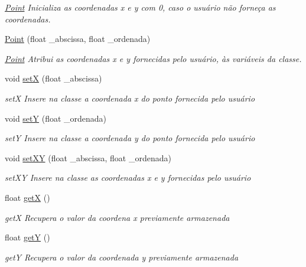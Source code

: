 \begin{DoxyCompactItemize}
\begin{DoxyCompactList}\small\item\em \hyperlink{class_point}{Point} Inicializa as coordenadas x e y com 0, caso o usuário não forneça as coordenadas. \end{DoxyCompactList}\item 
\hyperlink{class_point_a8c100b422fca2e51ddda13512a44f75a}{Point} (float \+\_\+abscissa, float \+\_\+ordenada)
\begin{DoxyCompactList}\small\item\em \hyperlink{class_point}{Point} Atribui as coordenadas x e y fornecidas pelo usuário, às variáveis da classe. \end{DoxyCompactList}\item 
void \hyperlink{class_point_a44d3365a8b5e0475e637bbf05e904f45}{setX} (float \+\_\+abscissa)
\begin{DoxyCompactList}\small\item\em setX Insere na classe a coordenada x do ponto fornecida pelo usuário \end{DoxyCompactList}\item 
void \hyperlink{class_point_a10dd1687db939fa9085482338c3a5ac2}{setY} (float \+\_\+ordenada)
\begin{DoxyCompactList}\small\item\em setY Insere na classe a coordenada y do ponto fornecida pelo usuário \end{DoxyCompactList}\item 
void \hyperlink{class_point_a94b06959bc7a93675f973dc2036b651a}{set\+XY} (float \+\_\+abscissa, float \+\_\+ordenada)
\begin{DoxyCompactList}\small\item\em set\+XY Insere na classe as coordenadas x e y fornecidas pelo usuário \end{DoxyCompactList}\item 
float \hyperlink{class_point_acc27466778cc87a662bba40268c4c0c8}{getX} ()
\begin{DoxyCompactList}\small\item\em getX Recupera o valor da coordena x previamente armazenada \end{DoxyCompactList}\item 
float \hyperlink{class_point_a3cccbca94719ddde353cce86ce0e2f64}{getY} ()
\begin{DoxyCompactList}\small\item\em getY Recupera o valor da coordenada y previamente armazenada \end{DoxyCompactList}\item 

\end{DoxyCompactItemize}

